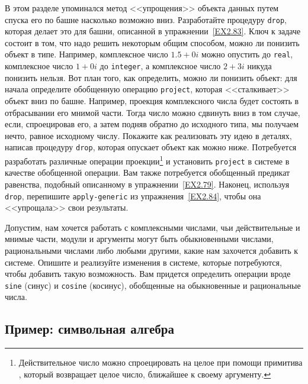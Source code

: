 \begin{exercise}{2.85}\label{EX2.85}%
%
%
В этом разделе упоминался метод <<упрощения>> объекта 
данных путем спуска его по башне насколько возможно вниз.
Разработайте процедуру {\tt drop}, которая делает это для
башни, описанной в упражнении~\ref{EX2.83}.  Ключ к задаче
состоит в том, что надо решить некоторым общим способом, можно ли
понизить объект в типе.  Например, комплексное число $1.5+0i$
можно опустить до {\tt real}, комплексное число $1+0i$
до {\tt integer}, а комплексное число $2+3i$
никуда понизить нельзя.  Вот план того, как определить, можно ли
понизить объект:  для начала определите обобщенную операцию
{\tt project}, которая <<сталкивает>> объект вниз по башне.
Например, проекция комплексного числа будет состоять в отбрасывании его мнимой части.  Тогда число можно сдвинуть вниз в
том случае, если, спроецировав его, а затем подняв обратно до исходного типа, 
мы получаем нечто, равное исходному числу.  Покажите как реализовать эту идею
в деталях, написав процедуру {\tt drop}, которая опускает
объект как можно ниже.  Потребуется разработать различные операции
проекции\footnote{Действительное число можно спроецировать на целое
при помощи примитива , который возвращает целое
число, ближайшее к своему аргументу.} 
и установить 
{\tt project} в системе в качестве обобщенной операции.  Вам
также потребуется обобщенный предикат равенства, подобный описанному в 
упражнении~\ref{EX2.79}.  Наконец, используя
{\tt drop}, перепишите {\tt apply-generic} из 
упражнения~\ref{EX2.84}, чтобы она <<упрощала>> свои результаты.
\end{exercise}

\begin{exercise}{2.86}\label{EX2.86}%
Допустим, нам хочется работать с комплексными
числами, чьи действительные и мнимые части, модули и аргументы могут
быть обыкновенными числами, рациональными числами либо любыми другими,
какие нам захочется добавить к системе.  Опишите и реализуйте
изменения в системе, которые потребуются, чтобы добавить такую
возможность.  Вам придется определить операции вроде {\tt sine}
(синус) и {\tt cosine} (косинус), обобщенные на
обыкновенные и рациональные числа.

\end{exercise}

\subsection{Пример: символьная алгебра}
\label{EXAMPLE-SYMBOLIC-ALGEBRA}


